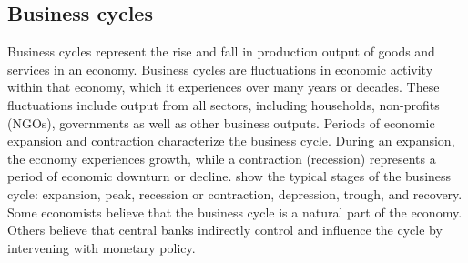 \subsection{Business cycles}
Business cycles represent the rise and fall in production output of goods and services in an economy. Business cycles are fluctuations in economic activity within that economy, which it experiences over many years or decades. These fluctuations include output from all sectors, including households, non-profits (NGOs), governments as well as other business outputs. Periods of economic expansion and contraction characterize the business cycle. During an expansion, the economy experiences growth, while a contraction (recession) represents a period of economic downturn or decline.  show the typical stages of the business cycle: expansion, peak, recession or contraction, depression, trough, and recovery.
Some economists believe that the business cycle is a natural part of the economy. Others believe that central banks indirectly control and influence the cycle by intervening with monetary policy.



